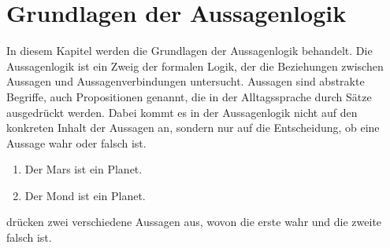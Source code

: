\chapter{Grundlagen der Aussagenlogik}\label{sec:Grundlagen}

In diesem Kapitel werden die Grundlagen der Aussagenlogik behandelt. Die Aussagenlogik ist ein Zweig der formalen Logik, der die Beziehungen zwischen Aussagen und Aussagenverbindungen untersucht. Aussagen sind abstrakte Begriffe, auch Propositionen genannt, die in der Alltagssprache durch Sätze ausgedrückt werden. Dabei kommt es in der Aussagenlogik nicht auf den konkreten Inhalt der Aussagen an, sondern nur auf die Entscheidung, ob eine Aussage wahr oder falsch ist.

\begin{ex} \label{Beispiel 4.0} \end{ex}
\begin{enumerate}
\item Der Mars ist ein Planet. 
\item  Der Mond ist ein Planet. 
\end{enumerate}

drücken zwei verschiedene Aussagen aus, wovon die erste wahr und die zweite falsch ist.





